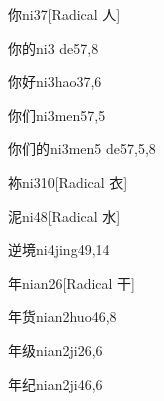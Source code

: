 \begin{verbete}{你}{ni3}{7}[Radical 人]
\end{verbete}

\begin{verbete}{你的}{ni3 de5}{7,8}
\end{verbete}

\begin{verbete}{你好}{ni3hao3}{7,6}
\end{verbete}

\begin{verbete}{你们}{ni3men5}{7,5}
\end{verbete}

\begin{verbete}{你们的}{ni3men5 de5}{7,5,8}
\end{verbete}

\begin{verbete}{袮}{ni3}{10}[Radical 衣]
\end{verbete}

\begin{verbete}{泥}{ni4}{8}[Radical 水]
\end{verbete}

\begin{verbete}{逆境}{ni4jing4}{9,14}
\end{verbete}

\begin{verbete}{年}{nian2}{6}[Radical 干]
\end{verbete}

\begin{verbete}{年货}{nian2huo4}{6,8}
\end{verbete}

\begin{verbete}{年级}{nian2ji2}{6,6}
\end{verbete}

\begin{verbete}{年纪}{nian2ji4}{6,6}
\end{verbete}

